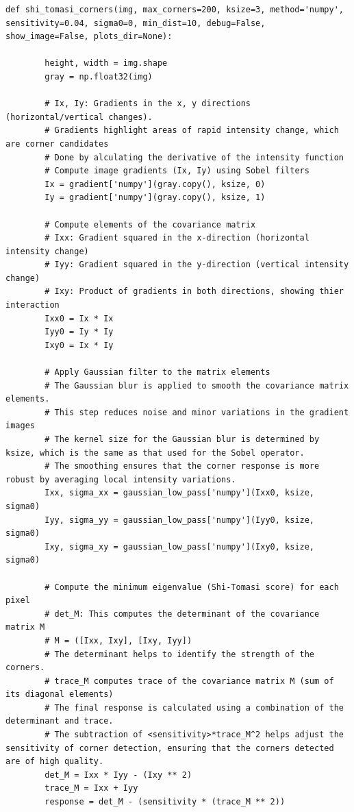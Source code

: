 \documentclass[11pt, conference, letterpaper]{IEEEtran}
\begin{document}
\onecolumn
\begin{lstlisting}[style=python, caption={Shi-Tomasi Corners Function}, label={lst:shi-tomasi}]
    def shi_tomasi_corners(img, max_corners=200, ksize=3, method='numpy', sensitivity=0.04, sigma0=0, min_dist=10, debug=False, show_image=False, plots_dir=None):
    
        height, width = img.shape
        gray = np.float32(img)
            
        # Ix, Iy: Gradients in the x, y directions (horizontal/vertical changes).
        # Gradients highlight areas of rapid intensity change, which are corner candidates
        # Done by alculating the derivative of the intensity function
        # Compute image gradients (Ix, Iy) using Sobel filters
        Ix = gradient['numpy'](gray.copy(), ksize, 0)
        Iy = gradient['numpy'](gray.copy(), ksize, 1)
            
        # Compute elements of the covariance matrix
        # Ixx: Gradient squared in the x-direction (horizontal intensity change)
        # Iyy: Gradient squared in the y-direction (vertical intensity change)
        # Ixy: Product of gradients in both directions, showing thier interaction
        Ixx0 = Ix * Ix
        Iyy0 = Iy * Iy
        Ixy0 = Ix * Iy

        # Apply Gaussian filter to the matrix elements
        # The Gaussian blur is applied to smooth the covariance matrix elements. 
        # This step reduces noise and minor variations in the gradient images 
        # The kernel size for the Gaussian blur is determined by ksize, which is the same as that used for the Sobel operator. 
        # The smoothing ensures that the corner response is more robust by averaging local intensity variations.
        Ixx, sigma_xx = gaussian_low_pass['numpy'](Ixx0, ksize, sigma0)
        Iyy, sigma_yy = gaussian_low_pass['numpy'](Iyy0, ksize, sigma0)
        Ixy, sigma_xy = gaussian_low_pass['numpy'](Ixy0, ksize, sigma0)
  
        # Compute the minimum eigenvalue (Shi-Tomasi score) for each pixel
        # det_M: This computes the determinant of the covariance matrix M
        # M = ([Ixx, Ixy], [Ixy, Iyy])
        # The determinant helps to identify the strength of the corners.
        # trace_M computes trace of the covariance matrix M (sum of its diagonal elements)
        # The final response is calculated using a combination of the determinant and trace.
        # The subtraction of <sensitivity>*trace_M^2 helps adjust the sensitivity of corner detection, ensuring that the corners detected are of high quality.
        det_M = Ixx * Iyy - (Ixy ** 2)
        trace_M = Ixx + Iyy
        response = det_M - (sensitivity * (trace_M ** 2))


\end{lstlisting}
\end{document}
